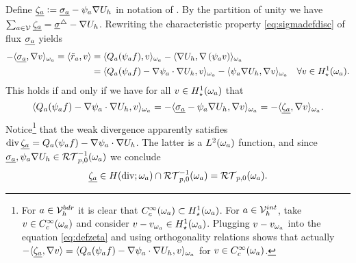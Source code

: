 \documentclass[thesis.tex]{subfiles}
\begin{document}
Define $\underline{\zeta_a} := \underline{\sigma_a} - \psi_a \nabla U_h$ in notation of \cite{ernequil}. By the partition of unity we have 
$\sum_{a \in \mathcal{V}} \underline{\zeta_a} = \underline{\sigma}^\triangle - \nabla U_h$. Rewriting the characteristic property \eqref{eq:sigmadefdisc} of flux $\underline{\sigma_a}$ yields
\begin{align*}
  -\langle \underline{\sigma_a}, \nabla v \rangle_{\omega_a}  = \langle \tilde r_a, v \rangle &=  \langle Q_a(\psi_a f), v \rangle_{\omega_a} - \langle \nabla U_h, \nabla \left(\psi_a v\right) \rangle_{\omega_a} \\
  &=  \langle Q_a(\psi_a f) - \nabla \psi_a \cdot \nabla U_h, v \rangle_{\omega_a} - \langle \psi_a \nabla U_h, \nabla v \rangle_{\omega_a} \quad \forall v \in H_\star^1(\omega_a).
\end{align*}
This holds if and only if  we have for all $v \in H_\star^1(\omega_a)$ that
\begin{equation}
  \label{eq:defzeta}
  \langle Q_a(\psi_a f) - \nabla \psi_a \cdot \nabla U_h, v \rangle_{\omega_a} = - \langle \underline{\sigma_a} - \psi_a \nabla U_h, \nabla v \rangle_{\omega_a} = - \langle \underline{\zeta_a}, \nabla v \rangle_{\omega_a}.
\end{equation}
Notice\footnote{
For $a\in \mathcal{V}_h^{bdr}$ it is clear that $C_c^{\infty}(\omega_a) \subset H_\star^1(\omega_a)$. For $a \in \mathcal{V}_h^{int}$, take $v \in C_c^{\infty}(\omega_a)$ and consider $v - v_{\omega_a} \in H_\star^1(\omega_a)$. Plugging $v - v_{\omega_a}$ into the equation \eqref{eq:defzeta} and using orthogonality relations shows that actually $ - \langle \underline{\zeta_a}, \nabla v \rangle = \langle Q_a(\psi_a f) - \nabla \psi_a \cdot \nabla U_h, v \rangle_{\omega_a}$ for $v \in C_c^{\infty}(\omega_a)$.}
that the weak divergence apparently satisfies  $\operatorname{div} \underline{\zeta_a} = Q_a(\psi_a f) - \nabla \psi_a\cdot \nabla U_h$.
The latter is a $L^2(\omega_a)$ function, and since
 $\underline{\sigma_a},\psi_a\nabla U_h \in \mathcal{RT}_{p,0}^{-1}(\omega_a)$ we conclude
\[
  \underline{\zeta_a} \in H(\operatorname{div}; \omega_a) \cap \mathcal{RT}_{p,0}^{-1}(\omega_a) = \mathcal{RT}_{p,0}(\omega_a).
\]
\end{document}
